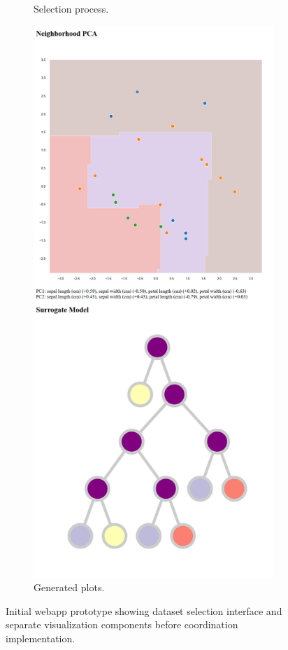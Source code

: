 \begin{figure}[htbp]
\begin{subfigure}[c]{0.49\textwidth}
        \caption{Selection process.}
    \end{subfigure}
    \hfill
    \begin{subfigure}[c]{0.49\textwidth}
        \centering
        \includegraphics[width=\textwidth]{images/first webapp b.png}
        \caption{Generated plots.}
    \end{subfigure}
    \caption{Initial webapp prototype showing dataset selection interface and separate visualization components before coordination implementation.}
    \label{fig:firstWebapp}
\end{figure}

